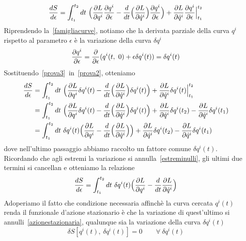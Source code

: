     \begin{equation}\label{prova2}
        \frac{dS}{d\epsilon} = \int_{t_1}^{t_2}dt~ \Big (\frac{\partial L}{\partial q^i} \frac{\partial q^i}{\partial\epsilon} - \frac{d}{dt} \Big (\frac{\partial L}{\partial\dot q^i} \Big) \frac{\partial q^i}{\partial\epsilon} \Big) + \frac{\partial L}{\partial\dot q^i} \frac{\partial q^i}{\partial\epsilon} \Big \vert_{t_1}^{t_2}
    \end{equation}
    Riprendendo la~\eqref{famigliacurve}, notiamo che la derivata parziale della curva $q^i$ rispetto al parametro $\epsilon$ è la variazione della curva $\delta q^i$
    \begin{equation}\label{prova3}
        \frac{\partial q^i}{\partial\epsilon} = \frac{\partial}{\partial\epsilon} (q^i(t, ~ 0) + \epsilon \delta q^i(t)) = \delta q^i(t)
    \end{equation}
    Sostituendo~\eqref{prova3}~in~\eqref{prova2}, otteniamo 
    \begin{equation*}
    \begin{aligned}
        \frac{dS}{d\epsilon} & = \int_{t_1}^{t_2}dt~ \Big (\frac{\partial L}{\partial q^i} \delta q^i(t) - \frac{d}{dt} \Big (\frac{\partial L}{\partial\dot q^i} \Big) \delta q^i(t) \Big) + \frac{\partial L}{\partial\dot q^i} \delta q^i(t) \Big \vert_{t_1}^{t_2} \\  & = \int_{t_1}^{t_2}dt~ \Big (\frac{\partial L}{\partial q^i} \delta q^i(t) - \frac{d}{dt} \Big (\frac{\partial L}{\partial\dot q^i} \Big) \delta q^i(t) \Big) + \frac{\partial L}{\partial\dot q^i} \delta q^i(t_2) - \frac{\partial L}{\partial\dot q^i} \delta q^i(t_1) \\ & = \int_{t_1}^{t_2}dt~ \delta q^i(t) \Big (\frac{\partial L}{\partial q^i}  - \frac{d}{dt} \Big (\frac{\partial L}{\partial\dot q^i} \Big) \Big) + \frac{\partial L}{\partial\dot q^i} \delta q^i(t_2) - \frac{\partial L}{\partial\dot q^i} \delta q^i(t_1)
    \end{aligned}
    \end{equation*}
    dove nell'ultimo passaggio abbiamo raccolto un fattore comune $\delta q^i(t)$. Ricordando che agli estremi la variazione si annulla~\eqref{estreminulli}, gli ultimi due termini si cancellan e otteniamo la relazione
    \begin{equation} \label{prova4}
        \frac{dS}{d\epsilon} = \int_{t_1}^{t_2}dt~ \delta q^i(t) \Big (\frac{\partial L}{\partial q^i}  - \frac{d}{dt} \frac{\partial L}{\partial\dot q^i} \Big)
    \end{equation}
    Adoperiamo il fatto che condizione necessaria affinchè la curva cercata $q^i(t)$ renda il funzionale d'azione stazionario è che la variazione di quest'ultimo si annulli~\eqref{azionestazionaria}, qualunque sia la variazione della curva $\delta q^i(t)$
    \begin{equation} \label{prova5}
        \delta S[q^i(t), ~ \delta q^i(t)] = 0 \qquad \forall ~ \delta q^i(t)
    \end{equation}
